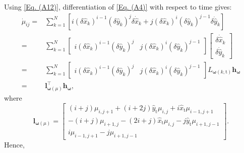 \documentclass[lettersize,journal]{IEEEtran}
\begin{document}
Using \eqref{Eq. (A12)}, differentiation of \eqref{Eq. (A4)} with respect to time gives:
\begin{align} \label{Eq. (A13)}
    \dot{\mu}_{ij} =& \sum^{N}_{k=1} \left[i(\delta \hat{x}_k)^{i-1} (\delta \hat{y}_k)^j\delta \dot{\hat{x}}_k + j(\delta \hat{x}_k)^{i} (\delta \hat{y}_k)^{j-1} \delta \dot{\hat{y}}_k \right] \nonumber \\
    =& \sum^{N}_{k=1} \begin{bmatrix}
    i(\delta \hat{x}_k)^{i-1} (\delta \hat{y}_k)^j & j(\delta \hat{x}_k)^{i} (\delta \hat{y}_k)^{j-1}
    \end{bmatrix} \begin{bmatrix} \delta \dot{\hat{x}}_{k} \\ \delta \dot{\hat{y}}_{k} \end{bmatrix} \nonumber \\
    =& \sum^{N}_{k=1} \begin{bmatrix}
     i(\delta \hat{x}_k)^{i-1} (\delta \hat{y}_k)^j & j(\delta \hat{x}_k)^{i} (\delta \hat{y}_k)^{j-1}
    \end{bmatrix} L_{\boldsymbol{\omega}(k,\text{t})} \boldsymbol{h}_{\boldsymbol{\omega}} \nonumber \\
    =& \boldsymbol{l}_{\boldsymbol{\omega}(\mu)}^{\top} \boldsymbol{h}_{\boldsymbol{\omega}},
\end{align}
where
\begin{equation*}
    \boldsymbol{l}_{\boldsymbol{\omega}(\mu)} = \begin{bmatrix} (i+j) \mu_{i,j+1} + (i + 2j) \hat{y}_{\text{t}} \mu_{i,j} + i \hat{x}_{\text{t}} \mu_{i-1,j+1} \\ - (i+j) \mu_{i+1,j} - (2i + j) \hat{x}_{\text{t}} \mu_{i,j} - j \hat{y}_{\text{t}} \mu_{i+1,j-1} \\ i \mu_{i-1,j+1} - j \mu_{i+1,j-1} \end{bmatrix}.
\end{equation*}
Hence,
\end{document}
